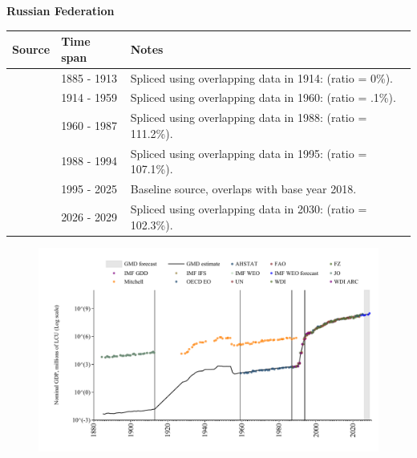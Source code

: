 \documentclass[12pt,a4paper,landscape]{article}
\begin{document}
\begin{adjustbox}{max totalsize={\paperwidth}{\paperheight},center}
\begin{minipage}[t][\textheight][t]{\textwidth}
\vspace*{0.5cm}
{}
\begin{center}
{\Large\bfseries Russian Federation}
\end{center}
\vspace{0.5cm}
\begin{table}[H]
\centering
\small
\begin{tabular}{|l|l|l|}
\hline
\textbf{Source} & \textbf{Time span} & \textbf{Notes} \\
\hline
\rowcolor{white}\cite{JO}& 1885 - 1913 &Spliced using overlapping data in 1914: (ratio = 0\%).\\
\rowcolor{lightgray}\cite{Mitchell}& 1914 - 1959 &Spliced using overlapping data in 1960: (ratio = .1\%).\\
\rowcolor{white}\cite{AHSTAT}& 1960 - 1987 &Spliced using overlapping data in 1988: (ratio = 111.2\%).\\
\rowcolor{lightgray}\cite{WDI}& 1988 - 1994 &Spliced using overlapping data in 1995: (ratio = 107.1\%).\\
\rowcolor{white}\cite{OECD_EO}& 1995 - 2025 &Baseline source, overlaps with base year 2018.\\
\rowcolor{lightgray}\cite{IMF_WEO_forecast}& 2026 - 2029 &Spliced using overlapping data in 2030: (ratio = 102.3\%).\\
\hline
\end{tabular}
\end{table}
\begin{figure}[H]
\centering
\includegraphics[width=\textwidth,height=0.6\textheight,keepaspectratio]{graphs/RUS_nGDP.pdf}
\end{figure}
\end{minipage}
\end{adjustbox}
\end{document}
